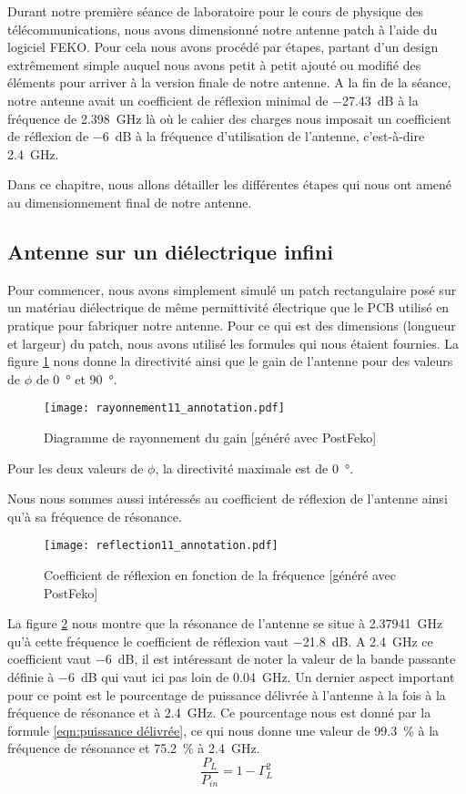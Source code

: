 Durant notre première séance de laboratoire pour le cours de physique des télécommunications, nous avons dimensionné notre antenne patch à l'aide du logiciel FEKO. Pour cela nous avons procédé par étapes, partant d'un design extrêmement simple auquel nous avons petit à petit ajouté ou modifié des éléments pour arriver à la version finale de notre antenne.
A la fin de la séance, notre antenne avait un coefficient de réflexion minimal de \SI{-27.43}{\deci\bel} à la fréquence de \SI{2.398}{\giga\hertz} là où le cahier des charges nous imposait un coefficient de réflexion de \SI{-6}{\deci\bel} à la fréquence d'utilisation de l'antenne, c'est-à-dire \SI{2.4}{\giga\hertz}.

Dans ce chapitre, nous allons détailler les différentes étapes qui nous ont amené au dimensionnement final de notre antenne.


\subsection{Antenne sur un diélectrique infini}
Pour commencer, nous avons simplement simulé un patch rectangulaire posé sur un matériau diélectrique de même permittivité électrique que le PCB utilisé en pratique pour fabriquer notre antenne. Pour ce qui est des dimensions (longueur et largeur) du patch, nous avons utilisé les formules qui nous étaient fournies. La figure \ref{fig:rayonnement_11} nous donne la directivité ainsi que le gain de l'antenne pour des valeurs de $\phi$ de \SI{0}{\degree} et \SI{90}{\degree}.
\begin{figure}[htbp]
  \centering
  \texttt{[image: rayonnement11\_annotation.pdf]}
  \caption{Diagramme de rayonnement du gain [généré avec PostFeko]\label{fig:rayonnement_11}}
\end{figure}
Pour les deux valeurs de $\phi$, la directivité maximale est de \SI{0}{\degree}.

Nous nous sommes aussi intéressés au coefficient de réflexion de l'antenne ainsi qu'à sa fréquence de résonance.
\begin{figure}[htbp]
  \centering
  \texttt{[image: reflection11\_annotation.pdf]}
  \caption{Coefficient de réflexion en fonction de la fréquence [généré avec PostFeko]\label{fig:reflection11_}}
\end{figure}
La figure \ref{fig:reflection11_} nous montre que la résonance de l'antenne se situe à \SI{2.37941}{\giga\hertz} qu'à cette fréquence le coefficient de réflexion vaut \SI{-21.8}{\deci\bel}. A \SI{2.4}{\giga\hertz} ce coefficient vaut \SI{-6}{\deci\bel}, il est intéressant de noter la valeur de la bande passante définie à \SI{-6}{\deci\bel} qui vaut ici pas loin de \SI{0.04}{\giga\hertz}. Un dernier aspect important pour ce point est le pourcentage de puissance délivrée à l'antenne à la fois à la fréquence de résonance et à \SI{2.4}{\giga\hertz}. Ce pourcentage nous est donné par la formule \ref{eqn:puissance délivrée}, ce qui nous donne une valeur de \SI{99.3}{\percent} à la fréquence de résonance et \SI{75.2}{\percent} à \SI{2.4}{\giga\hertz}.
\begin{equation}
\frac{P_L}{P_{in}} = 1-\Gamma_L^2
\label{eqn:puissance délivrée}
\end{equation}

